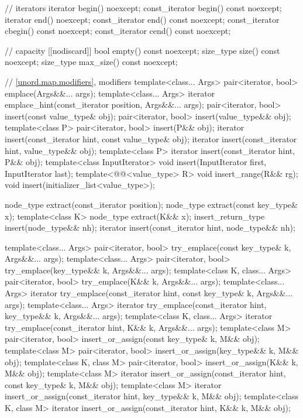 \begin{codeblock}
{{    // iterators
    iterator       begin() noexcept;
    const_iterator begin() const noexcept;
    iterator       end() noexcept;
    const_iterator end() const noexcept;
    const_iterator cbegin() const noexcept;
    const_iterator cend() const noexcept;

    // capacity
    [[nodiscard]] bool empty() const noexcept;
    size_type size() const noexcept;
    size_type max_size() const noexcept;

    // \ref{unord.map.modifiers}, modifiers
    template<class... Args> pair<iterator, bool> emplace(Args&&... args);
    template<class... Args> iterator emplace_hint(const_iterator position, Args&&... args);
    pair<iterator, bool> insert(const value_type& obj);
    pair<iterator, bool> insert(value_type&& obj);
    template<class P> pair<iterator, bool> insert(P&& obj);
    iterator       insert(const_iterator hint, const value_type& obj);
    iterator       insert(const_iterator hint, value_type&& obj);
    template<class P> iterator insert(const_iterator hint, P&& obj);
    template<class InputIterator> void insert(InputIterator first, InputIterator last);
    template<@@<value_type> R>
      void insert_range(R&& rg);
    void insert(initializer_list<value_type>);

    node_type extract(const_iterator position);
    node_type extract(const key_type& x);
    template<class K> node_type extract(K&& x);
    insert_return_type insert(node_type&& nh);
    iterator           insert(const_iterator hint, node_type&& nh);

    template<class... Args>
      pair<iterator, bool> try_emplace(const key_type& k, Args&&... args);
    template<class... Args>
      pair<iterator, bool> try_emplace(key_type&& k, Args&&... args);
    template<class K, class... Args>
      pair<iterator, bool> try_emplace(K&& k, Args&&... args);
    template<class... Args>
      iterator try_emplace(const_iterator hint, const key_type& k, Args&&... args);
    template<class... Args>
      iterator try_emplace(const_iterator hint, key_type&& k, Args&&... args);
    template<class K, class... Args>
      iterator try_emplace(const_iterator hint, K&& k, Args&&... args);
    template<class M>
      pair<iterator, bool> insert_or_assign(const key_type& k, M&& obj);
    template<class M>
      pair<iterator, bool> insert_or_assign(key_type&& k, M&& obj);
    template<class K, class M>
      pair<iterator, bool> insert_or_assign(K&& k, M&& obj);
    template<class M>
      iterator insert_or_assign(const_iterator hint, const key_type& k, M&& obj);
    template<class M>
      iterator insert_or_assign(const_iterator hint, key_type&& k, M&& obj);
    template<class K, class M>
      iterator insert_or_assign(const_iterator hint, K&& k, M&& obj);

}}
\end{codeblock}
